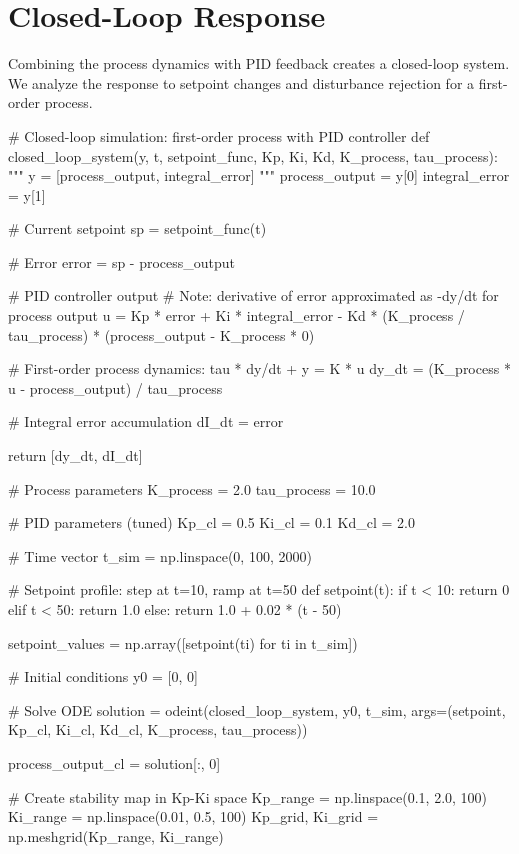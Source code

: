\documentclass[11pt,a4paper]{article}
\begin{document}
\section{Closed-Loop Response}

Combining the process dynamics with PID feedback creates a closed-loop system. We analyze the response to setpoint changes and disturbance rejection for a first-order process.

\begin{pycode}
# Closed-loop simulation: first-order process with PID controller
def closed_loop_system(y, t, setpoint_func, Kp, Ki, Kd, K_process, tau_process):
    """
    y = [process_output, integral_error]
    """
    process_output = y[0]
    integral_error = y[1]

    # Current setpoint
    sp = setpoint_func(t)

    # Error
    error = sp - process_output

    # PID controller output
    # Note: derivative of error approximated as -dy/dt for process output
    u = Kp * error + Ki * integral_error - Kd * (K_process / tau_process) * (process_output - K_process * 0)

    # First-order process dynamics: tau * dy/dt + y = K * u
    dy_dt = (K_process * u - process_output) / tau_process

    # Integral error accumulation
    dI_dt = error

    return [dy_dt, dI_dt]

# Process parameters
K_process = 2.0
tau_process = 10.0

# PID parameters (tuned)
Kp_cl = 0.5
Ki_cl = 0.1
Kd_cl = 2.0

# Time vector
t_sim = np.linspace(0, 100, 2000)

# Setpoint profile: step at t=10, ramp at t=50
def setpoint(t):
    if t < 10:
        return 0
    elif t < 50:
        return 1.0
    else:
        return 1.0 + 0.02 * (t - 50)

setpoint_values = np.array([setpoint(ti) for ti in t_sim])

# Initial conditions
y0 = [0, 0]

# Solve ODE
solution = odeint(closed_loop_system, y0, t_sim,
                  args=(setpoint, Kp_cl, Ki_cl, Kd_cl, K_process, tau_process))

process_output_cl = solution[:, 0]

# Create stability map in Kp-Ki space
Kp_range = np.linspace(0.1, 2.0, 100)
Ki_range = np.linspace(0.01, 0.5, 100)
Kp_grid, Ki_grid = np.meshgrid(Kp_range, Ki_range)


\end{pycode}
\end{document}
